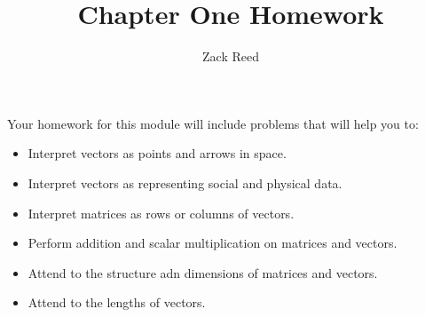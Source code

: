 \documentclass{ximera}
\author{Zack Reed}
\title{Chapter One Homework}
\begin{document}
 
\begin{abstract}
\end{abstract}
 
\maketitle
 
Your homework for this module will include problems that will help you to:
 
\begin{itemize}
\item Interpret vectors as points and arrows in space.
\item Interpret vectors as representing social and physical data.
\item Interpret matrices as rows or columns of vectors.
\item Perform addition and scalar multiplication on matrices and vectors.
\item Attend to the structure adn dimensions of matrices and vectors.
\item Attend to the lengths of vectors.
\end{itemize}
 
 
\end{document}
